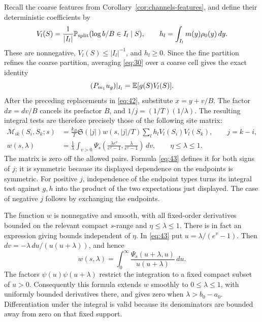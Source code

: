 Recall the coarse features from Corollary~\ref{cor:channels-features},
and define their deterministic coefficients by
\[
 V_l(S)=\frac1{|I_l|}
          \mathbb P_{\rm split}(\log b/B\in I_l\mid S),
 \qquad h_l=\int_{I_l}m(y)\rho_0(y)\,dy.
\]
These are nonnegative, \(V_l(S)\le |I_l|^{-1}\), and \(h_l\ge0\).
Since the fine partition refines the coarse partition, averaging
\eqref{eq:30} over a coarse cell gives the exact identity
\[
 (P_{m_1}u_g)|_{I_l}=\mathbb E[g(S)V_l(S)].
\]
After the preceding replacements in \eqref{eq:42}, substitute
\(x=y+v/B\).  The factor \(dx=dv/B\) cancels its prefactor \(B\),
and \(1/j=(1/T)(1/\lambda)\).  The resulting integral tests are
therefore precisely those of the following site matrix:
\begin{equation}\label{eq:43}
 \begin{split}
 \mathcal M_{ik}(S_i,S_k;s)
 &=\frac{k_B}{T}\mathfrak S(|j|)
       w(s,|j|/T)\sum_l h_lV_l(S_i)V_l(S_k),\qquad j=k-i,\\
 w(s,\lambda)
 &=\frac1\lambda\int_{v>0}
   \Psi_s\left(\frac{\lambda e^v}{e^v-1},
               \frac{\lambda}{e^v-1}\right)\,dv,
       \qquad \eta\le\lambda\le1.
 \end{split}
\end{equation}
The matrix is zero off the allowed pairs.  Formula \eqref{eq:43}
defines it for both signs of \(j\); it is symmetric because its
displayed dependence on the endpoints is symmetric.  For positive
\(j\), independence of the endpoint types turns its integral test
against \(g,h\) into the product of the two expectations just
displayed.  The case of negative \(j\) follows by exchanging the
endpoints.

The function \(w\) is nonnegative and smooth, with all fixed-order
derivatives bounded on the relevant compact \(s\)-range and
\(\eta\le\lambda\le1\).  There is in fact an expression giving
bounds independent of \(\eta\).  In \eqref{eq:43} put
\(u=\lambda/(e^v-1)\).  Then
\(dv=-\lambda\,du/(u(u+\lambda))\), and hence
\begin{equation}\label{eq:kernel-w-ratio}
 w(s,\lambda)=\int_0^\infty
           \frac{\Psi_s(u+\lambda,u)}{u(u+\lambda)}\,du.
\end{equation}
The factors \(\psi(u)\psi(u+\lambda)\) restrict the integration to
a fixed compact subset of \(u>0\).  Consequently this formula
extends \(w\) smoothly to \(0\le\lambda\le1\), with uniformly
bounded derivatives there, and gives zero when
\(\lambda>b_0-a_0\).  Differentiation under the integral is valid
because its denominators are bounded away from zero on that fixed
support.

